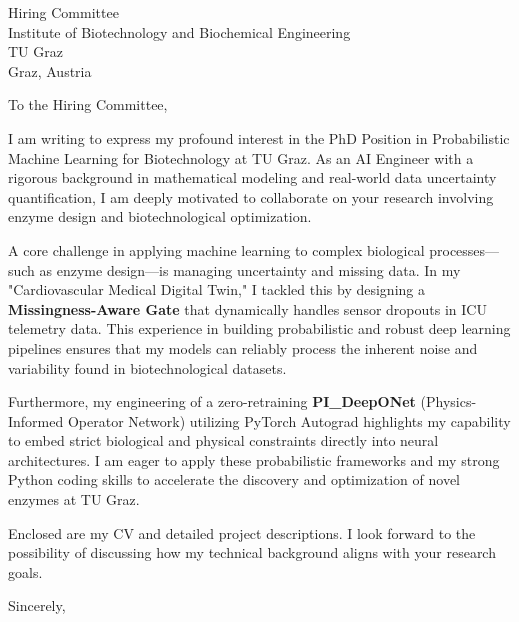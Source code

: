 \documentclass[11pt,a4paper]{letter}
\begin{document}
\begin{letter}{
    Hiring Committee \\
    Institute of Biotechnology and Biochemical Engineering \\
    TU Graz \\
    Graz, Austria
}
\opening{To the Hiring Committee,}

I am writing to express my profound interest in the PhD Position in Probabilistic Machine Learning for Biotechnology at TU Graz. As an AI Engineer with a rigorous background in mathematical modeling and real-world data uncertainty quantification, I am deeply motivated to collaborate on your research involving enzyme design and biotechnological optimization.

A core challenge in applying machine learning to complex biological processes—such as enzyme design—is managing uncertainty and missing data. In my "Cardiovascular Medical Digital Twin," I tackled this by designing a \textbf{Missingness-Aware Gate} that dynamically handles sensor dropouts in ICU telemetry data. This experience in building probabilistic and robust deep learning pipelines ensures that my models can reliably process the inherent noise and variability found in biotechnological datasets.

Furthermore, my engineering of a zero-retraining \textbf{PI\_DeepONet} (Physics-Informed Operator Network) utilizing PyTorch Autograd highlights my capability to embed strict biological and physical constraints directly into neural architectures. I am eager to apply these probabilistic frameworks and my strong Python coding skills to accelerate the discovery and optimization of novel enzymes at TU Graz.

Enclosed are my CV and detailed project descriptions. I look forward to the possibility of discussing how my technical background aligns with your research goals.

\closing{Sincerely,}
\end{letter}
\end{document}

